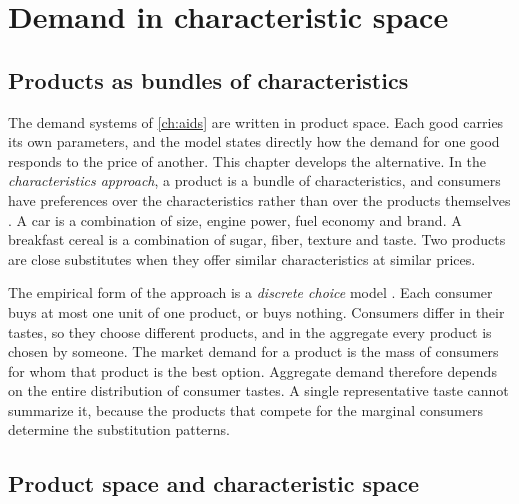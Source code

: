 
\section{Demand in characteristic space}\label{sec:06-charspace}

\subsection{Products as bundles of characteristics}\label{sec:06-bundles}

The demand systems of \cref{ch:aids} are written in product space. Each good carries its own parameters,
and the model states directly how the demand for one good responds to the price of another. This chapter
develops the alternative. In the \emph{characteristics approach}, a product is a bundle of characteristics,
and consumers have preferences over the characteristics rather than over the products themselves
\citep{Lancaster1966,Gorman1980}. A car is a combination of size, engine power, fuel economy and brand. A
breakfast cereal is a combination of sugar, fiber, texture and taste. Two products are close substitutes when
they offer similar characteristics at similar prices.

The empirical form of the approach is a \emph{discrete choice} model \citep{McFadden1974}. Each consumer buys
at most one unit of one product, or buys nothing. Consumers differ in their tastes, so they choose different
products, and in the aggregate every product is chosen by someone. The market demand for a product is the
mass of consumers for whom that product is the best option. Aggregate demand therefore depends on the entire
distribution of consumer tastes. A single representative taste cannot summarize it, because the products that
compete for the marginal consumers determine the substitution patterns.

\subsection{Product space and characteristic space}\label{sec:06-ps-cs}

